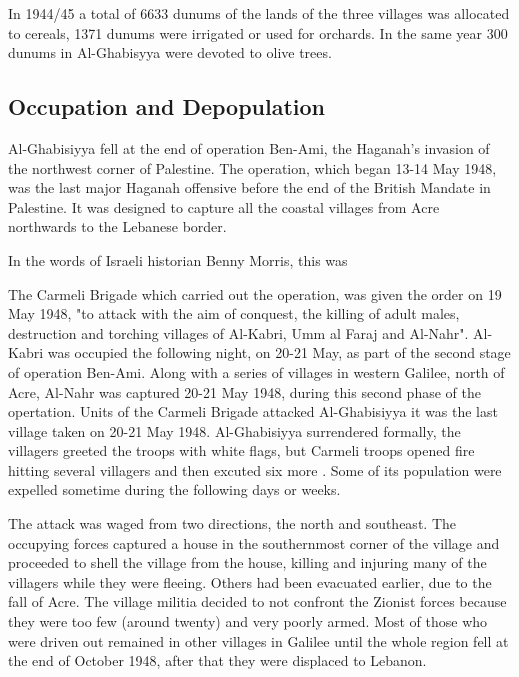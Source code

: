 In 1944/45 a total of 6633 dunums of the lands of the three villages was allocated to cereals, 1371 dunums were irrigated or used for orchards. In the same year 300 dunums in Al-Ghabisyya were devoted to olive trees\citep{Khalidi2015}.

\subsection{Occupation and Depopulation}

Al-Ghabisiyya fell at the end of operation Ben-Ami, the Haganah's invasion of the northwest corner of Palestine. The operation, which began 13-14 May 1948, was the last major Haganah offensive before the end of the British Mandate in Palestine. It was designed to capture all the coastal villages from Acre northwards to the Lebanese border\citep{Khalidi2015}.

In the words of Israeli historian Benny Morris, this was \cite[p.252]{Morris2004}

The Carmeli Brigade which carried out the operation, was given the order on 19 May 1948, "to attack with the aim of conquest, the killing of adult males, destruction and torching villages of Al-Kabri, Umm al Faraj and Al-Nahr"\cite[p.253]{Morris2004}. Al-Kabri was occupied the following night, on 20-21 May, as part of the second stage of operation Ben-Ami. Along with a series of villages in western Galilee, north of Acre, Al-Nahr was captured 20-21 May 1948, during this second phase of the opertation. Units of the Carmeli Brigade attacked Al-Ghabisiyya it was the last village taken on 20-21 May 1948. Al-Ghabisiyya surrendered formally, the villagers greeted the troops with white flags, but Carmeli troops opened fire hitting several villagers and then excuted six more \citep{Morris2008}. Some of its population were expelled sometime during the following days or weeks\citep{Morris2004}.

The attack was waged from two directions, the north and southeast. The occupying forces captured a house in the southernmost corner of the village and proceeded to shell the village from the house, killing and injuring many of the villagers while they were fleeing. Others had been evacuated earlier, due to the fall of Acre. The village militia decided to not confront the Zionist forces because they were too few (around twenty) and very poorly armed. Most of those who were driven out remained in other villages in Galilee until the whole region fell at the end of October 1948, after that they were displaced to Lebanon\citep{Khalidi2015}.

